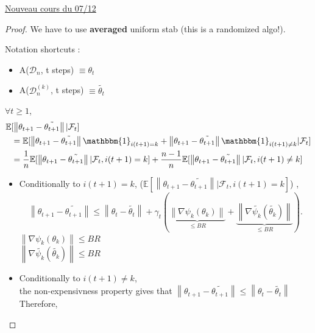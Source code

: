 \underline{Nouveau cours du 07/12} \\

\begin{proof}
    We have to use \textbf{averaged} uniform stab (this is a randomized algo!).
    
    Notation shortcuts : \begin{itemize}
        \item A($\mathcal{D}_n$, t steps) $\equiv \theta_t$
        \item A($\mathcal{D}_n^{(k)}$, t steps) $\equiv \tilde{\theta_t}$
    \end{itemize}

    
    $\forall t \geq 1$,
    \begin{align*}
        \mathbb{E} 
            & [ \left\| \theta_{t+1} - \tilde{\theta_{t+1}} \right\| | \mathcal{F}_t ] \\
            & = \mathbb{E}[ \left\| \theta_{t+1} - \tilde{\theta_{t+1}} \right\| \mathbbm{1}_{i(t+1)= k} + \left\| \theta_{t+1} - \tilde{\theta_{t+1}} \right\| \mathbbm{1}_{i(t+1)\neq  k}| \mathcal{F}_t] \\
            & = \frac{1}{n} \mathbb{E}[ \left\| \theta_{t+1} - \tilde{\theta_{t+1}} \right\| | \mathcal{F}_t, i(t+1)= k] + \frac{n-1}{n} \mathbb{E}[ \left\| \theta_{t+1} - \tilde{\theta_{t+1}} \right\| | \mathcal{F}_t, i(t+1) \neq k]
    \end{align*}
    
    \begin{itemize}
        \item Conditionally to $i(t+1) = k$,  ($\mathbb{E}[ \left\| \theta_{t+1} - \tilde{\theta_{t+1}} \right\| | \mathcal{F}_t, i(t+1)= k]$) , 
        \[
            \left\| \theta_{t+1} - \tilde{\theta_{t+1}} \right\| \leq \left\| \theta_{t} - \tilde{\theta_{t}} \right\| + \gamma _t ( \underbrace{\left\| \nabla \psi_k (\theta _k) \right\|}_{\leq BR}  + \underbrace{\left\| \nabla \tilde{\psi_k} (\tilde{\theta _k}) \right\|}_{\leq BR})
        .\]
        $\left\| \nabla \psi_k (\theta _k) \right\| \leq BR$ \\
        $\left\| \nabla \tilde{\psi_k} (\tilde{\theta _k}) \right\| \leq BR$

        \item Conditionally to $i(t+1) \neq  k$, \\
        the non-expensivness property gives that $\left\|  \theta_{t+1} - \tilde{\theta_{t+1}} \right\| \leq \left\|  \theta_{t} - \tilde{\theta_{t}} \right\|$ \\
        Therefore,
        

\end{itemize}
\end{proof}
